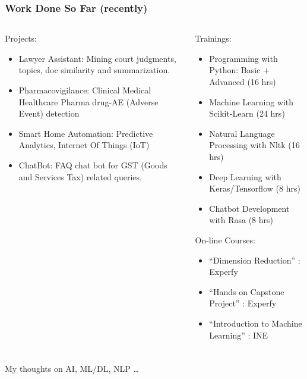 \begin{frame}[fragile]\frametitle{Work Done So Far (recently)}
\begin{columns}

    \begin{column}[T]{0.6\linewidth}
	Projects:
      \begin{itemize}
		\item Lawyer Assistant: Mining court judgments, topics, doc similarity and summarization.
		\item Pharmacovigilance: Clinical Medical Healthcare Pharma drug-AE (Adverse Event) detection
		\item Smart Home Automation: Predictive Analytics, Internet Of Things (IoT)
		\item ChatBot: FAQ chat bot for GST (Goods and Services Tax) related queries.
	  \end{itemize}

    \end{column}
    \begin{column}[T]{0.4\linewidth}
	Trainings:
      \begin{itemize}
		\item Programming with Python: Basic + Advanced (16 hrs)
		\item Machine Learning with Scikit-Learn (24 hrs)
		\item Natural Language Processing with Nltk (16 hrs)
		\item Deep Learning with Keras/Tensorflow (8 hrs)
		\item Chatbot Development with Rasa (8 hrs)
	  \end{itemize}
	  On-line Courses:
      \begin{itemize}
		\item ``Dimension Reduction'' : Experfy
		\item ``Hands on Capstone Project'' : Experfy 
		\item ``Introduction to Machine Learning'' : INE
	  \end{itemize}	  
    \end{column}
  \end{columns}
\end{frame}


\begin{frame}[fragile]\frametitle{}
\begin{center}
{\Large My thoughts on AI, ML/DL, NLP \ldots}
\end{center}
\end{frame}

